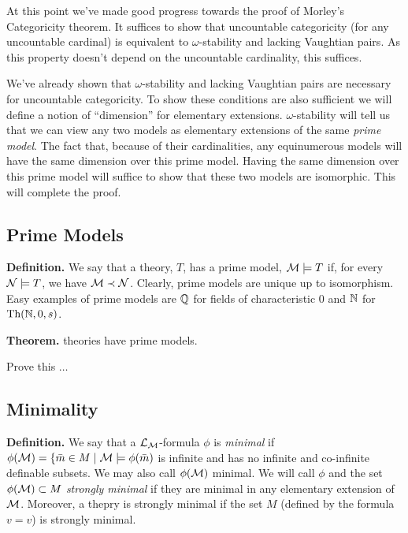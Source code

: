 At this point we've made good progress towards the proof of Morley's Categoricity theorem.
It suffices to show that uncountable categoricity (for any uncountable cardinal) is equivalent to \(\omega\)-stability and lacking Vaughtian pairs.
As this property doesn't depend on the uncountable cardinality, this suffices. 

We've already shown that \(\omega\)-stability and lacking Vaughtian pairs are necessary for uncountable categoricity.
To show these conditions are also sufficient we will define a notion of ``dimension'' for elementary extensions.
\(\omega\)-stability will tell us that we can view any two models as elementary extensions of the same \textit{prime model}.
The fact that, because of their cardinalities, any equinumerous models will have the same dimension over this prime model.
Having the same dimension over this prime model will suffice to show that these two models are isomorphic.
This will complete the proof. 

\subsection{Prime Models}

\textbf{Definition.} We say that a theory, \(T\),  has a prime model, \(\mathcal{M} \models T\) if, for every \(\mathcal{N} \models T\), we have \(\mathcal{M} \prec \mathcal{N}\). 
Clearly, prime models are unique up to isomorphism. Easy examples of prime models are \(\mathbb{Q}\) for fields of characteristic 0 and \(\mathbb{N}\) for \(\text{Th}(\mathbb{N}, 0, s)\). 

\textbf{Theorem.} \omst theories have prime models.
 
{\color{red}Prove this \(\ldots\)}

\subsection{Minimality}

\textbf{Definition.} We say that a \(\mathcal{L}_{\mathcal{M}}\)-formula \(\phi\) is \textit{minimal} if \(\phi(\mathcal{M}) = \{\bar{m} \in M \mid \mathcal{M} \models \phi(\bar{m})\) is infinite and has no infinite and co-infinite definable subsets. 
We may also call \(\phi(\mathcal{M})\) minimal. 
We will call \(\phi\) and the set \(\phi(\mathcal{M}) \subset M\) %
\textit{strongly minimal} if they are minimal in any elementary extension of \(\mathcal{M}\).
Moreover, a thepry is strongly minimal if the set \(M\) (defined by the formula \(v = v\)) is strongly minimal. 

